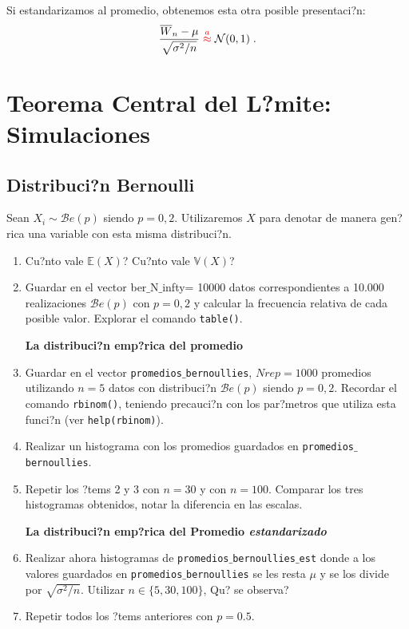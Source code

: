 \documentclass[12pt]{article}
\begin{document}
Si estandarizamos al promedio, obtenemos esta otra posible presentaci?n:  
\begin{equation}
\label{TCL-promedios}
\frac{\overline W_n-\mu}{\sqrt{\sigma^2/n}}\;{\color{red}\buildrel{a}\over\approx}\;
\mathcal N(0,1)\;.
\end{equation}

\section{Teorema Central del L?mite: Simulaciones}


\subsection{Distribuci?n Bernoulli}
Sean $X_i\sim \mathcal Be(p)$ siendo $p=0,2$. Utilizaremos $X$ para denotar de manera gen?rica una variable con esta misma distribuci?n.  


\begin{enumerate}	
	\item \textquestiondown Cu?nto vale $\mathbb E(X)$?
	\textquestiondown Cu?nto vale $\mathbb{V}(X)$?
	\item Guardar en el vector ber$\_$N$\_$infty= 10000 datos correspondientes a 10.000 realizaciones $\mathcal Be(p)$ con $p=0,2$ y calcular la frecuencia relativa de cada posible valor. 
	Explorar el comando \texttt{table()}. 
	
	
	\vspace{0.2cm}	
	\textbf{La distribuci?n emp?rica del promedio}
	
	\item Guardar en el  vector \texttt{promedios$\_$bernoullies}, $Nrep=1000$ promedios utilizando $n=5$ datos con distribuci?n $\mathcal Be(p)$ siendo $p=0,2$. Recordar  el comando \texttt{rbinom()}, teniendo  precauci?n con los par?metros que utiliza esta funci?n (ver \texttt{help(rbinom)}).
	\item Realizar un histograma con los promedios guardados en \texttt{promedios$\_$bernoullies}.
	\item Repetir los ?tems 2 y 3 con $n=30$ y con $n=100$. Comparar los tres histogramas obtenidos, notar la diferencia en las escalas.
	
	\vspace{0.2cm}
	\textbf{La distribuci?n emp?rica  del Promedio \textit{estandarizado}}
	
	\item  Realizar ahora histogramas de \texttt{promedios$\_$bernoullies$\_$est} donde a los valores guardados en \texttt{promedios$\_$bernoullies} se les resta $\mu$ y se los divide por $\sqrt{\sigma^2/n}$. Utilizar $n \in \{5,30,100\}$, \textquestiondown Qu? se observa?
	
	
	\item Repetir todos los ?tems anteriores con $p=0.5$. 
	
\end{enumerate}
\end{document}
